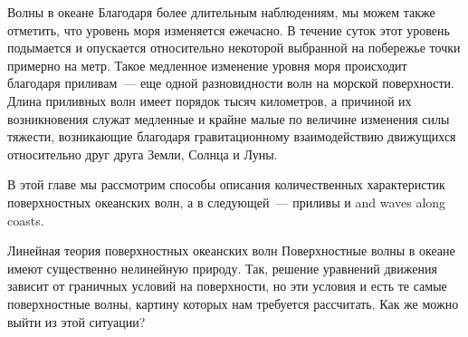 \begin{chapter}{Волны в океане}
Благодаря более длительным наблюдениям, мы можем также отметить, что уровень
моря изменяется ежечасно. В течение суток этот уровень подымается и опускается
относительно некоторой выбранной на побережье точки примерно на метр. Такое
медленное изменение уровня моря происходит благодаря приливам~--- еще одной
разновидности волн на морской поверхности. Длина приливных волн 
имеет порядок тысяч километров, а причиной их возникновения служат медленные
и крайне малые по величине изменения силы тяжести, возникающие благодаря
гравитационному взаимодействию движущихся относительно друг друга Земли,
Солнца и Луны.
%

В этой главе мы рассмотрим способы описания количественных характеристик
поверхностных океанских волн, а в следующей~--- приливы и and waves along
coasts.
%

\begin{section}{Линейная теория поверхностных океанских волн}\label{sec:LinWaves}
Поверхностные волны в океане имеют существенно
нелинейную природу. Так, решение уравнений движения зависит от граничных 
условий на поверхности, но эти условия и есть те самые поверхностные волны,
картину которых нам требуется рассчитать. Как же можно выйти из этой ситуации?
%


\end{section}
\end{chapter}
